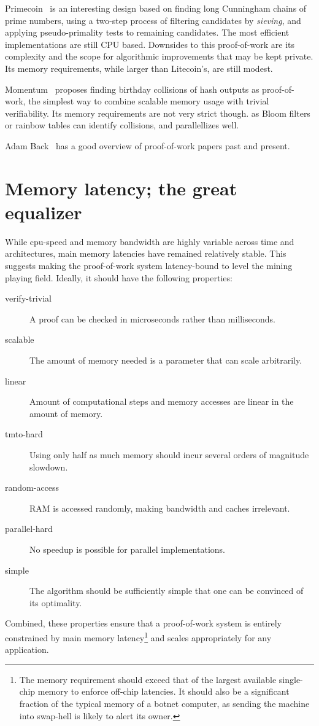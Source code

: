 \documentclass[11pt, oneside]{article}
\begin{document}
Primecoin~\cite{king2013} is an interesting design based on finding long Cunningham chains
of prime numbers, using a two-step process of filtering candidates by {\em sieving}, and applying
pseudo-primality tests to remaining candidates. The most efficient implementations are still CPU based.
Downsides to this proof-of-work are its complexity and the scope for algorithmic improvements
that may be kept private. Its memory requirements, while larger than Litecoin's, are still modest.

Momentum~\cite{larimer2013} proposes finding birthday collisions of hash outputs as proof-of-work,
the simplest way to combine scalable memory usage with trivial verifiability.
Its memory requirements are not very strict though. as Bloom filters or rainbow tables
can identify collisions, and parallellizes well.

Adam Back~\cite{back2014} has a good overview of proof-of-work papers past and present.

\section{Memory latency; the great equalizer}
While cpu-speed and memory bandwidth are highly variable across time and architectures,
main memory latencies have remained relatively stable.
This suggests making the proof-of-work system latency-bound to level the mining playing field.
Ideally, it should have the following properties:
\begin{description}
\item[verify-trivial] A proof can be checked in microseconds rather than milliseconds.
\item[scalable] The amount of memory needed is a parameter that can scale arbitrarily.
\item[linear] Amount of computational steps and memory accesses are linear in the amount of memory.
\item[tmto-hard] Using only half as much memory should incur several orders of magnitude slowdown.
\item[random-access] RAM is accessed randomly, making bandwidth and caches irrelevant.
\item[parallel-hard] No speedup is possible for parallel implementations.
\item[simple] The algorithm should be sufficiently simple that one can be convinced of its optimality.
\end{description}
Combined, these properties ensure that a proof-of-work system is entirely
constrained by main memory latency\footnote{The memory requirement should
exceed that of the largest available
single-chip memory to enforce off-chip latencies. It should also be a
significant fraction of the typical memory of a botnet computer, as sending the
machine into swap-hell is likely to alert its owner.} and scales appropriately
for any application.
\end{document}
